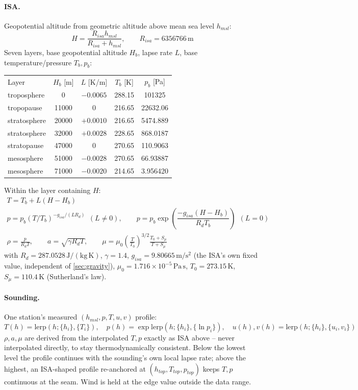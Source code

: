 {\paragraph{ISA.} Geopotential altitude from geometric altitude above mean sea level $h_{msl}$:
\begin{equation}
    H = \frac{R_{isa}h_{msl}}{R_{isa}+h_{msl}}, \qquad R_{isa} = 6356766\,\mathrm{m}
\end{equation}
Seven layers, base geopotential altitude $H_b$, lapse rate $L$, base temperature/pressure $T_b, p_b$:
\begin{center}
\begin{tabular}{l c c c c}
Layer & $H_b$ [m] & $L$ [K/m] & $T_b$ [K] & $p_b$ [Pa] \\
troposphere  & 0     & $-0.0065$ & 288.15 & 101325   \\
tropopause   & 11000 & $0$       & 216.65 & 22632.06 \\
stratosphere & 20000 & $+0.0010$ & 216.65 & 5474.889 \\
stratosphere & 32000 & $+0.0028$ & 228.65 & 868.0187 \\
stratopause  & 47000 & $0$       & 270.65 & 110.9063 \\
mesosphere   & 51000 & $-0.0028$ & 270.65 & 66.93887 \\
mesosphere   & 71000 & $-0.0020$ & 214.65 & 3.956420 \\
\end{tabular}
\end{center}
Within the layer containing $H$:
\begin{gather}
    T = T_b + L(H-H_b) \\
    p = p_b(T/T_b)^{-g_{isa}/(LR_d)} \ \ (L\neq0), \qquad
    p = p_b\exp\!\left(\dfrac{-g_{isa}(H-H_b)}{R_dT_b}\right) \ \ (L=0) \\
    \rho = \frac{p}{R_dT}, \qquad a = \sqrt{\gamma R_dT}, \qquad
    \mu = \mu_0\left(\frac{T}{T_0}\right)^{3/2}\frac{T_0+S_\mu}{T+S_\mu}
\end{gather}
with $R_d = 287.0528\,\mathrm{J/(kg\,K)}$, $\gamma = 1.4$, $g_{isa} = 9.80665\,\mathrm{m/s^2}$ (the
ISA's own fixed value, independent of \autoref{sec:gravity}), $\mu_0 = 1.716\times10^{-5}\,\mathrm{Pa\,s}$,
$T_0 = 273.15\,\mathrm{K}$, $S_\mu = 110.4\,\mathrm{K}$ (Sutherland's law).

\paragraph{Sounding.} One station's measured $(h_{msl}, p, T, u, v)$ profile:
\begin{equation}
    T(h) = \mathrm{lerp}(h;\{h_i\},\{T_i\}), \quad
    p(h) = \exp\mathrm{lerp}(h;\{h_i\},\{\ln p_i\}), \quad
    u(h),v(h) = \mathrm{lerp}(h;\{h_i\},\{u_i,v_i\})
\end{equation}
$\rho, a, \mu$ are derived from the interpolated $T, p$ exactly as ISA above -- never interpolated
directly, to stay thermodynamically consistent. Below the lowest level the profile continues with
the sounding's own local lapse rate; above the highest, an ISA-shaped profile re-anchored at
$(h_{top}, T_{top}, p_{top})$ keeps $T, p$ continuous at the seam. Wind is held at the edge value
outside the data range.

}
